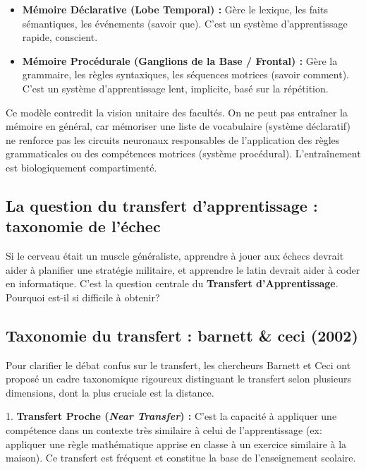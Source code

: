 \begin{itemize}\item \textbf{Mémoire Déclarative (Lobe Temporal) :} Gère le lexique, les faits sémantiques, les événements (savoir \og que\fg{}). C'est un système d'apprentissage rapide, conscient.\item \textbf{Mémoire Procédurale (Ganglions de la Base / Frontal) :} Gère la grammaire, les règles syntaxiques, les séquences motrices (savoir \og comment\fg{}). C'est un système d'apprentissage lent, implicite, basé sur la répétition.\end{itemize}Ce modèle contredit la vision unitaire des facultés. On ne peut pas \og entraîner la mémoire\fg{} en
général, car mémoriser une liste de vocabulaire (système déclaratif) ne renforce pas les circuits
neuronaux responsables de l'application des règles grammaticales ou des compétences motrices
(système procédural).\cite{II-1-1-ref31} L'entraînement est biologiquement compartimenté.



\subsection{La question du transfert d'apprentissage : taxonomie de l'échec}

Si le cerveau était un muscle généraliste, apprendre à jouer aux échecs devrait aider à planifier
une stratégie militaire, et apprendre le latin devrait aider à coder en informatique. C'est la
question centrale du \textbf{Transfert d'Apprentissage}. Pourquoi est-il si difficile à obtenir?



\subsection{Taxonomie du transfert : barnett \& ceci (2002)}

Pour clarifier le débat confus sur le transfert, les chercheurs Barnett et Ceci ont proposé un cadre
taxonomique rigoureux distinguant le transfert selon plusieurs dimensions, dont la plus cruciale est
la \og distance\fg{}.\cite{II-1-1-ref15}

1. \textbf{Transfert Proche (\textit{Near Transfer}) :} C'est la capacité à appliquer une compétence
dans un contexte très similaire à celui de l'apprentissage (ex: appliquer une règle mathématique
apprise en classe à un exercice similaire à la maison). Ce transfert est fréquent et constitue la
base de l'enseignement scolaire.\cite{II-1-1-ref35}

